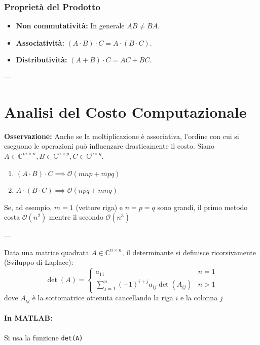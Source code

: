 \documentclass[a4paper,12pt]{article}
\begin{document}
	\subsubsection*{Proprietà del Prodotto}
	\begin{itemize}
		\item \textbf{Non commutatività:} In generale $AB \neq BA$.
		\item \textbf{Associatività:} $(A \cdot B) \cdot C = A \cdot (B \cdot C)$.
		\item \textbf{Distributività:} $(A + B) \cdot C = AC + BC$.
	\end{itemize}
	
	---
	
	\section*{Analisi del Costo Computazionale}
	
	\textbf{Osservazione:} Anche se la moltiplicazione è associativa, l'ordine con cui si eseguono le operazioni può influenzare drasticamente il costo.
	Siano $A \in \mathbb{C}^{m \times n}, B \in \mathbb{C}^{n \times p}, C \in \mathbb{C}^{p \times q}$.
	\begin{enumerate}
		\item $(A \cdot B) \cdot C \implies \mathcal{O}(mnp + mpq)$
		\item $A \cdot (B \cdot C) \implies \mathcal{O}(npq + mnq)$
	\end{enumerate}
	
	Se, ad esempio, $m=1$ (vettore riga) e $n=p=q$ sono grandi, il primo metodo costa $\mathcal{O}(n^2)$ mentre il secondo $\mathcal{O}(n^3)$
	
	---
	
	\begin{tcolorbox}[title=Definizione: Determinante]
		Data una matrice quadrata $A \in \mathbb{C}^{n \times n}$, il determinante si definisce ricorsivamente (Sviluppo di Laplace):
		\[
		\det(A) = \begin{cases} a_{11} & n=1 \\ \sum_{j=1}^{n} (-1)^{i+j} a_{ij} \det(A_{ij}) & n > 1 \end{cases}
		\]
		dove $A_{ij}$ è la sottomatrice ottenuta cancellando la riga $i$ e la colonna $j$
	\end{tcolorbox}
	
	\paragraph{In MATLAB:} Si usa la funzione \texttt{det(A)}
	
\end{document}
